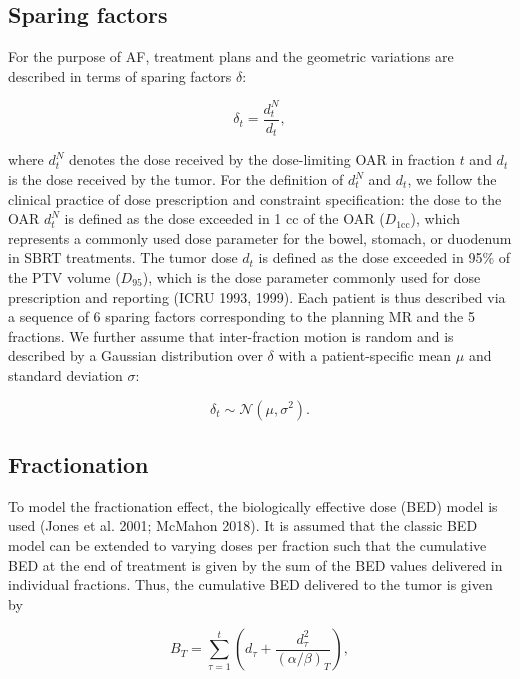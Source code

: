 \documentclass[11pt]{article}
\begin{document}
\subsection{Sparing factors}

For the purpose of AF, treatment plans and the geometric variations are described in terms of sparing factors $\delta$:

\begin{equation}
\delta_t = \frac{d_t^N}{d_t},
\label{eq:sparing-factor}
\end{equation}

where $d_t^N$ denotes the dose received by the dose-limiting OAR in fraction $t$ and $d_t$ is the dose received by the tumor. For the definition of $d_t^N$ and $d_t$, we follow the clinical practice of dose prescription and constraint specification: the dose to the OAR $d_t^N$ is defined as the dose exceeded in 1 cc of the OAR ($D_{1\mathrm{cc}}$), which represents a commonly used dose parameter for the bowel, stomach, or duodenum in SBRT treatments. The tumor dose $d_t$ is defined as the dose exceeded in 95\% of the PTV volume ($D_{95}$), which is the dose parameter commonly used for dose prescription and reporting (ICRU 1993, 1999). Each patient is thus described via a sequence of 6 sparing factors corresponding to the planning MR and the 5 fractions. We further assume that inter-fraction motion is random and is described by a Gaussian distribution over $\delta$ with a patient-specific mean $\mu$ and standard deviation $\sigma$:

\begin{equation}
\delta_t \sim \mathcal{N}(\mu, \sigma^2).
\label{eq:delta-distribution}
\end{equation}

\subsection{Fractionation}

To model the fractionation effect, the biologically effective dose (BED) model is used (Jones et al. 2001; McMahon 2018). It is assumed that the classic BED model can be extended to varying doses per fraction such that the cumulative BED at the end of treatment is given by the sum of the BED values delivered in individual fractions. Thus, the cumulative BED delivered to the tumor is given by

\begin{equation}
B_T = \sum_{\tau=1}^{t}\left(d_{\tau} + \frac{d_{\tau}^2}{(\alpha/\beta)_T}\right),
\label{eq:bed-tumor}
\end{equation}
\end{document}
